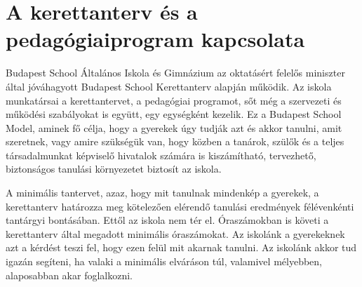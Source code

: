 \section[A kerettanterv és a pedagógia program  kapcsolata]{A kerettanterv és a pedagógiai\hfill\break program  kapcsolata%
}
\label{sec:tanterv-program}
Budapest School Általános Iskola és Gimnázium az oktatásért felelős miniszter által jóváhagyott Budapest School Kerettanterv alapján működik. Az iskola munkatársai a kerettantervet, a pedagógiai programot, sőt még a szervezeti és működési szabályokat is együtt, egy egységként kezelik. Ez a Budapest School Model, aminek fő célja, hogy a gyerekek úgy tudják azt és akkor tanulni, amit szeretnek, vagy amire szükségük van, hogy közben a tanárok, szülők és a teljes társadalmunkat képviselő hivatalok számára is kiszámítható, tervezhető, biztonságos tanulási környezetet biztosít az iskola.

A minimális tantervet, azaz, hogy mit tanulnak mindenkép a gyerekek, a kerettanterv határozza meg kötelezően elérendő tanulási eredmények félévenkénti tantárgyi bontásában. Ettől az iskola nem tér el. Óraszámokban is követi a kerettanterv által megadott minimális óraszámokat. Az iskolánk a gyerekeknek azt a kérdést teszi fel, hogy ezen felül mit akarnak tanulni. Az iskolánk akkor tud igazán segíteni, ha valaki a minimális elváráson túl, valamivel mélyebben, alaposabban akar foglalkozni.
